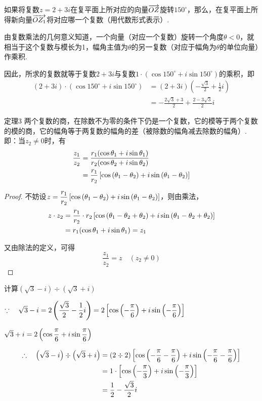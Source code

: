 \begin{example}
    如果将复数$z=2+3i$在复平面上所对应的向量$\overrightarrow{OZ}$旋转$150^{\circ}$，那么，在复平面上所得新向量$\overrightarrow{OZ_1}$将对应哪一个复数（用代数形式表示）.
\end{example}

\begin{solution}
    由复数乘法的几何意义知道，一个向量（对应一个复数）旋转一个角度$\theta<0$，就相当于这个复数与模长为1，幅角主值为$\theta$的另一复数（对应于幅角为$\theta$的单位向量）作乘积.

因此，所求的复数就等于复数$2+3i$与复数$1\cdot(\cos150^{\circ}+i\sin 150^{\circ})$的乘积，即
\[\begin{split}
    (2+3i)\cdot (\cos150^{\circ}+i\sin 150^{\circ})
    &=(2+3i)\left(-\frac{\sqrt{3}}{2}+\frac{1}{2}i\right)\\
&=-\frac{2\sqrt{3}+3}{2}+\frac{2-3\sqrt{3}}{2}i
\end{split}\]
\end{solution}

\begin{blk}
{定理3} 两个复数的商，在除数不为零的条件下仍是一个复数，它的模等于两个复数的模的商，它的幅角等于两复数的幅角的差（被除数的幅角减去除数的幅角）.即：当$z_2\ne 0$时，有
\[\begin{split}
    \dfrac{z_1}{z_2}&=\dfrac{r_1(\cos{\theta_1}+i\sin{\theta_1})}{r_2(\cos{\theta_2}+i\sin{\theta_2})}\\
    &=\dfrac{r_1}{r_2}\left[\cos\left(\theta_1-\theta_2\right)+i\sin\left(\theta_1-\theta_2\right)\right]
\end{split}\]

\end{blk}

\begin{proof}
不妨设$z=\dfrac{r_1}{r_2}\left[\cos\left(\theta_1-\theta_2\right)+i\sin\left(\theta_1-\theta_2\right)\right]$，则由乘法，
\[\begin{split}
    z\cdot z_2 &=\dfrac{r_1}{r_2}\cdot r_2\left[\cos\left(\theta_1-\theta_2+\theta_2\right)+i\sin\left(\theta_1-\theta_2+\theta_2\right)\right]\\
    &=r_1(\cos{\theta_1}+i\sin{\theta_1})=z_1
\end{split} \]

又由除法的定义，可得
\[\frac{z_1}{z_2}=z\quad (z_2\ne 0)\]
\end{proof}

\begin{example}
计算$\left(\sqrt{3}-i\right)\div \left(\sqrt{3}+i\right)$
\end{example}

\begin{solution}
$\because\quad \sqrt{3}-i=2\left(\dfrac{\sqrt{3}}{2}-\dfrac{1}{2}i\right)=2\left[\cos\left(-\dfrac{\pi}{6}\right)+i\sin\left(-\dfrac{\pi}{6}\right)\right]$

$\sqrt{3}+i=2\left(\cos{\dfrac{\pi}{6}}+i\sin{\dfrac{\pi}{6}}\right)$

\[\begin{split}
    \therefore\quad \left(\sqrt{3}-i\right)\div \left(\sqrt{3}+i\right)&=(2\div 2)\left[\cos\left(-\dfrac{\pi}{6}-\dfrac{\pi}{6}\right)+i\sin\left(-\dfrac{\pi}{6}-\dfrac{\pi}{6}\right)\right]\\
&=1\cdot \left[\cos\left(-\dfrac{\pi}{3}\right)+i\sin\left(-\dfrac{\pi}{3}\right)\right]\\
&=\dfrac{1}{2}-\dfrac{\sqrt{3}}{2}i
\end{split}\]
\end{solution}

